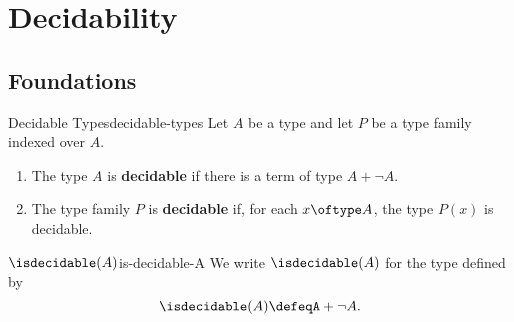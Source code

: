 \section{Decidability}\label{section-decidability}
\subsection{Foundations}\label{subsection-decidability-foundations}
\begin{definition}{Decidable Types}{decidable-types}%
    Let $A$ be a type and let $P$ be a type family indexed over $A$.
    \begin{enumerate}
        \item\label{decidable-types-decidable-types}The type $A$ is \textbf{decidable} if there is a term of type $A+\neg A$.%
        \item\label{decidable-types-decidable-type-families}The type family $P$ is \textbf{decidable} if, for each $x\oftype A$, the type $P(x)$ is decidable.
    \end{enumerate}
\end{definition}
\begin{notation}{$\isdecidable(A)$}{is-decidable-A}%
    We write $\isdecidable(A)$ for the type defined by
    \[
        \isdecidable(A)%
        \defeq%
        A+\neg A.%
    \]%
\end{notation}
